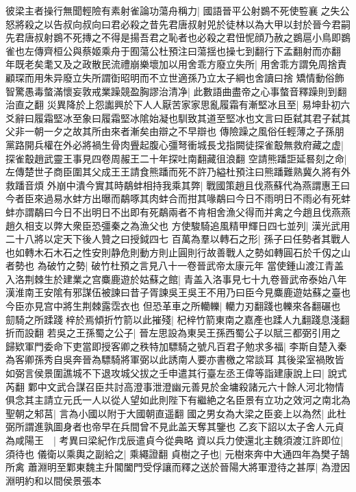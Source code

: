 彼梁主者操行無聞輕險有素射雀論功蕩舟稱力|{
	國語晉平公射鷃不死使䜿襄之失公怒將殺之以告叔向叔向曰君必殺之昔先君唐叔射兕於徒林以為大甲以封於晉今君嗣先君唐叔射鷃不死摶之不得是揚吾君之恥者也必殺之君忸怩顔乃赦之鷃扈小鳥即鷃雀也左傳齊桓公與蔡姬乘舟于囿蕩公杜預注曰蕩揺也操七到翻行下孟翻射而亦翻}
年既老矣耄又及之政散民流禮崩樂壞加以用舍乖方廢立失所|{
	用舍乖方謂免周捨責顧琛而用朱异廢立失所謂衘昭明而不立世適孫乃立太子綱也舍讀曰捨}
矯情動俗飾智驚愚毒螫滿懷妄敦戒業躁競盈胸謬治清净|{
	此數語曲盡帝之心事螫音釋躁則到翻治直之翻}
災異降於上怨讟興於下人人厭苦家家思亂履霜有漸堅冰且至|{
	易坤卦初六爻辭曰履霜堅冰至象曰履霜堅冰隂始凝也馴致其道至堅冰也文言曰臣弑其君子弑其父非一朝一夕之故其所由來者漸矣由辯之不早辯也}
傳險躁之風俗任輕薄之子孫朋黨路開兵權在外必將禍生骨肉舋起腹心彊弩衝城長戈指闕徒探雀鷇無救府藏之虚|{
	探雀鷇趙武靈王事見四卷周赧王二十年探吐南翻藏徂浪翻}
空請熊蹯詎延晷刻之命|{
	左傳楚世子商臣圍其父成王王請食熊蹯而死不許乃縊杜預注曰熊蹯難熟冀久將有外救蹯音煩}
外崩中潰今實其時鷸蚌相持我乘其弊|{
	戰國策趙且伐燕蘇代為燕謂惠王曰今者臣來過易水蚌方出曝而鷸啄其肉蚌合而拑其喙鷸曰今日不雨明日不雨必有死蚌蚌亦謂鷸曰今日不出明日不出即有死鷸兩者不肯相舍漁父得而并禽之今趙且伐燕燕趙久相支以弊大衆臣恐彊秦之為漁父也}
方使駿騎追風精甲輝日四七並列|{
	漢光武用二十八將以定天下後人贊之曰授鉞四七}
百萬為羣以轉石之形|{
	孫子曰任勢者其戰人也如轉木石木石之性安則静危則動方則止圓則行故善戰人之勢如轉圓石於千仭之山者勢也}
為破竹之勢|{
	破竹杜預之言見八十一卷晉武帝太康元年}
當使鍾山渡江青盖入洛荆棘生於建業之宫麋鹿遊於姑蘇之館|{
	青盖入洛事見七十九卷晉武帝泰始八年漢淮南王安隂有邪謀伍被諫曰昔子胥諫吳王吳王不用乃曰臣今見麋鹿遊姑蘇之臺也今臣亦見宫中將生荆棘露霑衣也}
但恐革車之所轥轢|{
	轥力刃翻踐也轢來各翻碾也}
劎騎之所蹂踐梓於焉傾折竹箭以此摧殘|{
	杞梓竹箭東南之嘉產也蹂人九翻踐息淺翻折而設翻}
若吳之王孫蜀之公子|{
	晉左思設為東吴王孫西蜀公子以賦三都弼引用之}
歸欵軍門委命下吏當即授客卿之秩特加驃騎之號凡百君子勉求多福|{
	李斯自楚入秦為客卿孫秀自吳奔晉為驃騎將軍弼以此誘南人要亦書檄之常談耳}
其後梁室禍敗皆如弼言侯景圍譙城不下退攻城父拔之壬申遣其行臺左丞王偉等詣建康說上曰|{
	說式芮翻}
鄴中文武合謀召臣共討高澄事泄澄幽元善見於金墉殺諸元六十餘人河北物情俱念其主請立元氏一人以從人望如此則陛下有繼絶之名臣景有立功之效河之南北為聖朝之邾莒|{
	言為小國以附于大國朝直遥翻}
國之男女為大梁之臣妾上以為然|{
	此杜弼所謂進孰圖身者也帝早在兵間曾不見此盖天奪其鑒也}
乙亥下詔以太子舍人元貞為咸陽王　|{
	考異曰梁紀作戊辰遣貞今從典略}
資以兵力使還北主魏須渡江許即位|{
	須待也}
儀衛以乘輿之副給之|{
	乘繩證翻}
貞樹之子也|{
	元樹來奔中大通四年為樊子鵠所禽}
蕭淵明至鄴東魏主升閶闔門受俘讓而釋之送於晉陽大將軍澄待之甚厚|{
	為澄因淵明約和以間侯景張本}
